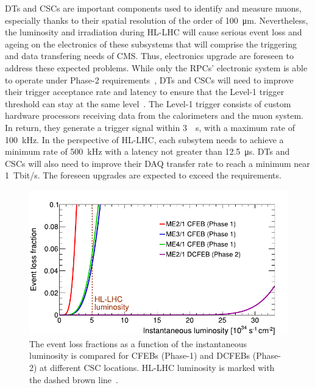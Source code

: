 	\acl{DT}s and \acl{CSC}s are important components used to identify and measure muons, especially thanks to their spatial resolution of the order of \SI{100}{\micro m}. Nevertheless, the luminosity and irradiation during HL-LHC will cause serious event loss and ageing on the electronics of these subsystems that will comprise the triggering and data transfering needs of CMS. Thus, electronics upgrade are foreseen to address these expected problems. While only the RPCs' electronic system is able to operate under Phase-2 requirements~\cite{CMSIITP}, DTs and CSCs will need to improve their trigger acceptance rate and latency to ensure that the Level-1 trigger threshold can stay at the same level~\cite{LEVEL1IR}. The Level-1 trigger consists of custom hardware processors receiving data from the calorimeters and the muon system. In return, they generate a trigger signal within \SI{3}{\mu s}, with a maximum rate of \SI{100}{kHz}. In the perspective of HL-LHC, each subsytem needs to achieve a minimum rate of \SI{500}{kHz} with a latency not greater than \SI{12.5}{\micro s}. DTs and CSCs will also need to improve their \acf{DAQ} transfer rate to reach a minimum near \SI{1}{Tbit/s}. The foreseen upgrades are expected to exceed the requirements.
	
\endgroup

\begingroup\setlength{\intextsep}{0pt}\setlength{\columnsep}{15pt}

	\begin{figure}
		\centering
		\includegraphics[width=\linewidth]{fig/chapt3/CSC-event-loss.pdf}
		\caption{\label{fig:CSC-event-loss} The event loss fractions as a function of the instantaneous luminosity is compared for CFEBs (Phase-1) and DCFEBs (Phase-2) at different CSC locations. HL-LHC luminosity is marked with the dashed brown line~\cite{PHASEIITP}.}
	\end{figure}
	
